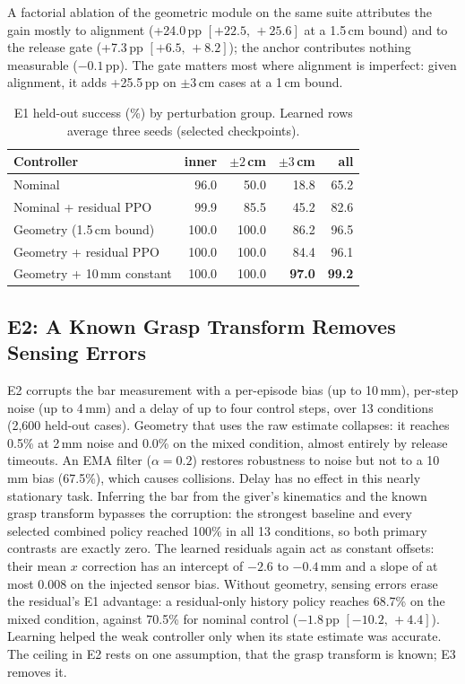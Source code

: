 \documentclass[conference,letterpaper]{IEEEtran}
\newcommand{\pp}{\,pp}
\newcommand{\ci}[2]{\mbox{$[#1,\,#2]$}}
\begin{document}
A factorial ablation of the geometric module on the same suite attributes the gain mostly to alignment
(+24.0\pp{} \ci{+22.5}{+25.6} at a 1.5\,cm bound) and to the release gate (+7.3\pp{} \ci{+6.5}{+8.2}); the anchor
contributes nothing measurable ($-0.1$\pp). The gate matters most where alignment is imperfect: given alignment, it
adds +25.5\pp{} on $\pm3$\,cm cases at a 1\,cm bound.

\begin{table}[t]
\centering
\caption{E1 held-out success (\%) by perturbation group. Learned rows average three seeds (selected checkpoints).}
\label{tab:e1}
\setlength{\tabcolsep}{4.5pt}
\begin{tabular}{@{}lrrrr@{}}
\toprule
Controller & inner & $\pm2$\,cm & $\pm3$\,cm & all \\
\midrule
Nominal & 96.0 & 50.0 & 18.8 & 65.2 \\
Nominal + residual PPO & 99.9 & 85.5 & 45.2 & 82.6 \\
Geometry (1.5\,cm bound) & 100.0 & 100.0 & 86.2 & 96.5 \\
Geometry + residual PPO & 100.0 & 100.0 & 84.4 & 96.1 \\
Geometry + 10\,mm constant & 100.0 & 100.0 & \textbf{97.0} & \textbf{99.2} \\
\bottomrule
\end{tabular}
\end{table}

\subsection{E2: A Known Grasp Transform Removes Sensing Errors}

E2 corrupts the bar measurement with a per-episode bias (up to 10\,mm), per-step noise (up to 4\,mm) and a delay
of up to four control steps, over 13 conditions (2,600 held-out cases). Geometry that uses the raw estimate collapses:
it reaches 0.5\% at 2\,mm noise and 0.0\% on the mixed condition, almost entirely by release timeouts. An EMA filter ($\alpha=0.2$) restores robustness to noise but not to a
10\,mm bias (67.5\%), which causes collisions. Delay has no effect in this nearly stationary task. Inferring the bar
from the giver's kinematics and the known grasp transform bypasses the corruption: the strongest baseline and every
selected combined policy reached 100\% in all 13 conditions, so both primary contrasts are exactly zero. The learned
residuals again act as constant offsets: their mean $x$ correction has an intercept of $-2.6$ to $-0.4$\,mm and a
slope of at most 0.008 on the injected sensor bias. Without
geometry, sensing errors erase the residual's E1 advantage: a residual-only history policy reaches 68.7\% on the
mixed condition, against 70.5\% for nominal control ($-1.8$\pp{} \ci{-10.2}{+4.4}). Learning helped the weak
controller only when its state estimate was accurate. The ceiling in E2 rests on one assumption, that the grasp
transform is known; E3 removes it.
\end{document}
